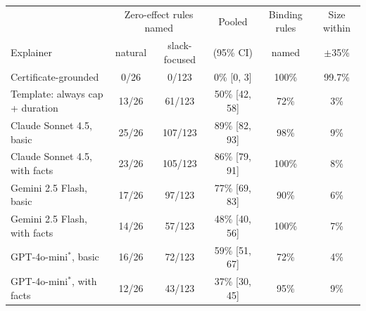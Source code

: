 \begin{tabular}{@{}lccccc@{}}
\toprule
& \multicolumn{2}{c}{Zero-effect rules named} & Pooled & Binding rules & Size within \\
Explainer & natural & slack-focused & (95\% CI) & named & $\pm$35\% \\
\midrule
Certificate-grounded & 0/26 & 0/123 & 0\% [0, 3] & 100\% & 99.7\% \\
Template: always cap + duration & 13/26 & 61/123 & 50\% [42, 58] & 72\% & 3\% \\
\midrule
Claude Sonnet 4.5, basic & 25/26 & 107/123 & 89\% [82, 93] & 98\% & 9\% \\
Claude Sonnet 4.5, with facts & 23/26 & 105/123 & 86\% [79, 91] & 100\% & 8\% \\
Gemini 2.5 Flash, basic & 17/26 & 97/123 & 77\% [69, 83] & 90\% & 6\% \\
Gemini 2.5 Flash, with facts & 14/26 & 57/123 & 48\% [40, 56] & 100\% & 7\% \\
GPT-4o-mini$^{*}$, basic & 16/26 & 72/123 & 59\% [51, 67] & 72\% & 4\% \\
GPT-4o-mini$^{*}$, with facts & 12/26 & 43/123 & 37\% [30, 45] & 95\% & 9\% \\
\bottomrule
\end{tabular}
